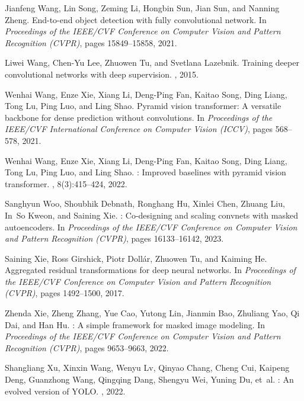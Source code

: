 \documentclass[10pt,twocolumn,letterpaper]{article}
\begin{document}
{\begin{thebibliography}{10}
		Jianfeng Wang, Lin Song, Zeming Li, Hongbin Sun, Jian Sun, and Nanning Zheng.
		\newblock End-to-end object detection with fully convolutional network.
		\newblock In {\em Proceedings of the IEEE/CVF Conference on Computer Vision and
			Pattern Recognition (CVPR)}, pages 15849--15858, 2021.
		
		Liwei Wang, Chen-Yu Lee, Zhuowen Tu, and Svetlana Lazebnik.
		\newblock Training deeper convolutional networks with deep supervision.
		, 2015.
		
		Wenhai Wang, Enze Xie, Xiang Li, Deng-Ping Fan, Kaitao Song, Ding Liang, Tong
		Lu, Ping Luo, and Ling Shao.
		\newblock Pyramid vision transformer: A versatile backbone for dense prediction
		without convolutions.
		\newblock In {\em Proceedings of the IEEE/CVF International Conference on
			Computer Vision (ICCV)}, pages 568--578, 2021.
		
		Wenhai Wang, Enze Xie, Xiang Li, Deng-Ping Fan, Kaitao Song, Ding Liang, Tong
		Lu, Ping Luo, and Ling Shao.
		: Improved baselines with pyramid vision transformer.
		, 8(3):415--424, 2022.
		
		Sanghyun Woo, Shoubhik Debnath, Ronghang Hu, Xinlei Chen, Zhuang Liu, In~So
		Kweon, and Saining Xie.
		: Co-designing and scaling convnets with masked
		autoencoders.
		\newblock In {\em Proceedings of the IEEE/CVF Conference on Computer Vision and
			Pattern Recognition (CVPR)}, pages 16133--16142, 2023.
		
		Saining Xie, Ross Girshick, Piotr Doll{\'a}r, Zhuowen Tu, and Kaiming He.
		\newblock Aggregated residual transformations for deep neural networks.
		\newblock In {\em Proceedings of the IEEE/CVF Conference on Computer Vision and
			Pattern Recognition (CVPR)}, pages 1492--1500, 2017.
		
		Zhenda Xie, Zheng Zhang, Yue Cao, Yutong Lin, Jianmin Bao, Zhuliang Yao, Qi
		Dai, and Han Hu.
		: A simple framework for masked image modeling.
		\newblock In {\em Proceedings of the IEEE/CVF Conference on Computer Vision and
			Pattern Recognition (CVPR)}, pages 9653--9663, 2022.
		
		Shangliang Xu, Xinxin Wang, Wenyu Lv, Qinyao Chang, Cheng Cui, Kaipeng Deng,
		Guanzhong Wang, Qingqing Dang, Shengyu Wei, Yuning Du, et~al.
		: An evolved version of {YOLO}.
		, 2022.
		

\end{thebibliography}}
\end{document}
